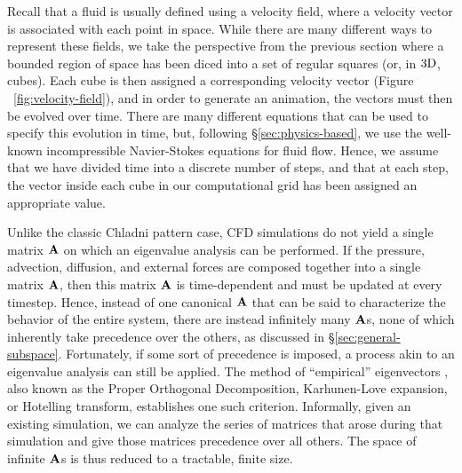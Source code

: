 Recall that a fluid is usually defined using a velocity field, where a velocity vector is associated with each point in space. While there are many different ways to represent these fields, we take the perspective from the previous section where a bounded region of space has been diced into a set of regular squares (or, in $3\textnormal{D}$, cubes). Each cube is then assigned a corresponding velocity vector (Figure ~\ref{fig:velocity-field}), and in order to generate an animation, the vectors must then be evolved over time. There are many different equations that can be used to specify this evolution in time, but, following \S \ref{sec:physics-based}, we use the well-known incompressible Navier-Stokes equations for fluid flow. Hence, we assume that we have divided time into a discrete number of steps, and that at each step, the vector inside each cube in our computational grid has been assigned an appropriate value. 


Unlike the classic Chladni pattern case, CFD simulations do not yield a single matrix $\mathbf{A}$ on which an eigenvalue analysis can be performed. If the pressure, advection, diffusion, and external forces are composed together into a single matrix $\mathbf{A}$, then this matrix $\mathbf{A}$ is time-dependent and must be updated at every timestep. Hence, instead of one canonical $\mathbf{A}$ that can be said to characterize the behavior of the entire system, there are instead infinitely many $\mathbf{A}$s, none of which inherently take precedence over the others, as discussed in \S \ref{sec:general-subspace}. Fortunately, if some sort of precedence is imposed, a process akin to an eigenvalue analysis can still be applied.
The method of ``empirical'' eigenvectors \cite{Ryckelynck2005}, also known as the Proper Orthogonal Decomposition, Karhunen-Love expansion, or Hotelling transform, establishes one such criterion. Informally, given an existing simulation, we can analyze the series of matrices that arose during that simulation and give those matrices precedence over all others. The space of infinite $\mathbf{A}$s is thus reduced to a tractable, finite size.


